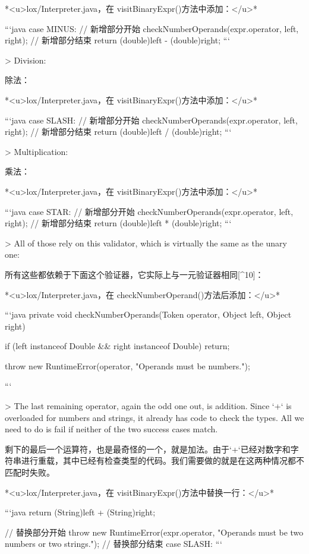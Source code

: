 \documentclass[cn,11pt,chinese]{elegantbook}
\begin{document}
{{{{*<u>lox/Interpreter.java，在 visitBinaryExpr()方法中添加：</u>*

```java
      case MINUS:  
				// 新增部分开始
        checkNumberOperands(expr.operator, left, right);
        // 新增部分结束
        return (double)left - (double)right;
```

> Division:

除法：

*<u>lox/Interpreter.java，在 visitBinaryExpr()方法中添加：</u>*

```java
      case SLASH:  
				// 新增部分开始
        checkNumberOperands(expr.operator, left, right);
        // 新增部分结束
        return (double)left / (double)right;
```

> Multiplication:

乘法：

*<u>lox/Interpreter.java，在 visitBinaryExpr()方法中添加：</u>*

```java
      case STAR:  
				// 新增部分开始
        checkNumberOperands(expr.operator, left, right);
        // 新增部分结束
        return (double)left * (double)right;
```

> All of those rely on this validator, which is virtually the same as the unary one:

所有这些都依赖于下面这个验证器，它实际上与一元验证器相同[^10]：

*<u>lox/Interpreter.java，在 checkNumberOperand()方法后添加：</u>*

```java
  private void checkNumberOperands(Token operator, Object left, Object right) {
    if (left instanceof Double && right instanceof Double) return;
    
    throw new RuntimeError(operator, "Operands must be numbers.");
  }
```

> The last remaining operator, again the odd one out, is addition. Since `+` is overloaded for numbers and strings, it already has code to check the types. All we need to do is fail if neither of the two success cases match.

剩下的最后一个运算符，也是最奇怪的一个，就是加法。由于`+`已经对数字和字符串进行重载，其中已经有检查类型的代码。我们需要做的就是在这两种情况都不匹配时失败。 

*<u>lox/Interpreter.java，在 visitBinaryExpr()方法中替换一行：</u>*

```java
          return (String)left + (String)right;
        }
        // 替换部分开始
        throw new RuntimeError(expr.operator,
            "Operands must be two numbers or two strings.");
        // 替换部分结束
      case SLASH:
```

}}}
\end{document}
